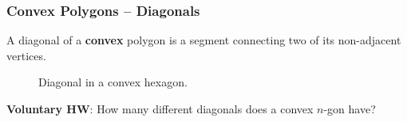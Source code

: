 \documentclass[aspectratio=169,11pt,svgnames,handout]{beamer}
\begin{document}
\begin{frame}
 \frametitle{Convex Polygons -- Diagonals}
 \begin{tcolorbox}[title=Diagonal in A Convex Polygon]
  A \alert{diagonal} of a \textbf{convex} polygon is a segment connecting two of
  its non-adjacent vertices.
 \end{tcolorbox}
 \begin{minipage}[c][4cm][c]{0.48\textwidth}
  \begin{figure}[H]
   \centering
   \caption*{\textcolor{PolygonCyan}{Diagonal} in a convex hexagon.}
  \end{figure}
 \end{minipage}
 \pause
 \begin{minipage}[c][4cm][c]{.48\textwidth}
  \vspace*{\fill}
  \textcolor{PolygonOrange}{\textbf{Voluntary HW}}: How many different diagonals
  does a convex $n$-gon have?
  \vspace*{\fill}
 \end{minipage}
\end{frame}
\end{document}
